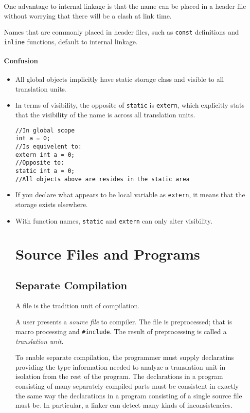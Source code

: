\documentclass[11pt, a4paper]{book}
\begin{document}
One advantage to internal linkage is that the name can be placed in a header
file without worrying that there will be a clash at link time.

Names that are commonly placed in header files, such as \verb|const| definitions
and \verb|inline| functions, default to internal linkage.

\subsubsection{Confusion}
\begin{itemize}
\item All global objects implicitly have static storage class and visible to all
translation units.
\item In terms of visibility, the opposite of \verb|static| is \verb|extern|,
which explicitly stats that the visibility of the name is across all translation
units.
\begin{verbatim}
//In global scope
int a = 0;
//Is equivelent to:
extern int a = 0;
//Opposite to:
static int a = 0;
//All objects above are resides in the static area 
\end{verbatim}

\item If you declare what appears to be local variable as \verb|extern|, it means that
the storage exists elsewhere.
\item With function names, \verb|static| and \verb|extern| can only alter
visibility.
\chapter{Source Files and Programs}
\section{Separate Compilation}
A file is the tradition unit of compilation.

A user presents a \emph{source file} to compiler. The file is preprocessed; that is macro processing and \verb|#include|. The result of preprocessing is called a \emph{translation unit}.

To enable separate compilation, the programmer must supply declaratins providing the type information needed to analyze a translation unit in isolation from the rest of the program. The declarations in a program consisting of many separately compiled parts must be consistent in exactly the same way the declarations in a program consisting of a single source file must be. In particular, a linker can detect many kinds of inconsistencies.


\end{itemize}
\end{document}

